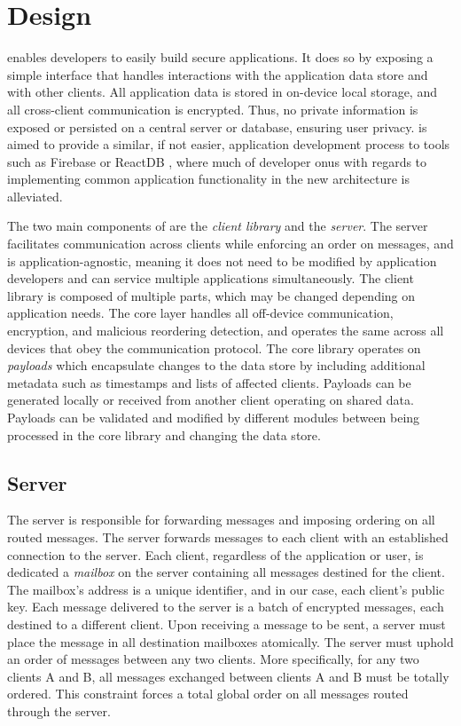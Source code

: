 \section{Design}

\name{} enables developers to easily build secure applications. It does so by exposing a simple interface that handles interactions with the application data store and with other clients. All application data is stored in on-device local storage, and all cross-client communication is encrypted. Thus, no private information is exposed or persisted on a central server or database, ensuring user privacy. \name{} is aimed to provide a similar, if not easier, application development process to tools such as Firebase  or ReactDB \tocite{}, where much of developer onus with regards to implementing common application functionality in the new architecture is alleviated.

The two main components of \name{} are the \textit{client library} and the \textit{\name{} server}. The server facilitates communication across clients while enforcing an order on messages, and is application-agnostic, meaning it does not need to be modified by application developers and can service multiple applications simultaneously. The client library is composed of multiple parts, which may be changed depending on application needs. The \name{} core layer handles all off-device communication, encryption, and malicious reordering detection, and operates the same across all devices that obey the \name{} communication protocol. The core library operates on \textit{payloads} which encapsulate changes to the data store by including additional metadata such as timestamps and lists of affected clients. Payloads can be generated locally or received from another client operating on shared data. Payloads can be validated and modified by different \name{} modules between being processed in the core library and changing the data store.


\subsection{Server}
The server is responsible for forwarding messages and imposing ordering on all routed messages. The server forwards messages to each client with an established connection to the server. Each client, regardless of the application or user, is dedicated a \textit{mailbox} on the server containing all messages destined for the client. The mailbox's address is a unique identifier, and in our case, each client's public key. Each message delivered to the server is a batch of encrypted messages, each destined to a different client. Upon receiving a message to be sent, a server must place the message in all destination mailboxes atomically. The server must uphold an order of messages between any two clients. More specifically, for any two clients A and B, all messages exchanged between clients A and B must be totally ordered. This constraint forces a total global order on all messages routed through the server. 

